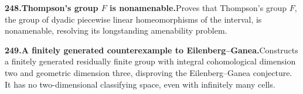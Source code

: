 \documentclass[11pt,a4paper]{article}
\begin{document}
  \par \begin{minipage}{\linewidth}
  \fontsize{10.5}{12.6}\selectfont\RaggedRight
  \hypertarget{result 248}{}
  {\bfseries\textcolor{muted}{248.}\enspace Thompson's group $F$ is nonamenable.}\enspace Proves that Thompson's group $F$, the group of dyadic piecewise linear homeomorphisms of the interval, is nonamenable, resolving its longstanding amenability problem.\par
  \end{minipage}\par\vspace{5pt}



  \par \begin{minipage}{\linewidth}
  \fontsize{10.5}{12.6}\selectfont\RaggedRight
  \hypertarget{result 249}{}
  {\bfseries\textcolor{muted}{249.}\enspace A finitely generated counterexample to Eilenberg--Ganea.}\enspace Constructs a finitely generated residually finite group with integral cohomological dimension two and geometric dimension three, disproving the Eilenberg--Ganea conjecture. It has no two-dimensional classifying space, even with infinitely many cells.\par
  \end{minipage}\par\vspace{5pt}
\end{document}
